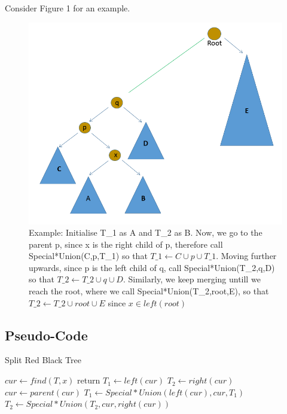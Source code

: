 \documentclass{article}
\begin{document}
Consider Figure 1 for an example.

\begin{figure}[h!]
\begin{center}
\includegraphics[scale=0.5]{tree.png}
\caption{ Example: Initialise T\_1 as A and T\_2 as B. Now, we go to the parent p, since x is the right child of p, therefore call Special*Union(C,p,T\_1) so that $T\_1 \gets C \cup p \cup T\_1$. Moving further upwards, since p is the left child of q, call Special*Union(T\_2,q,D) so that $T\_2 \gets T\_2 \cup q \cup D$. Similarly, we keep merging untill we reach the root, where we call Special*Union(T\_2,root,E), so that $T\_2 \gets T\_2 \cup root \cup E$ since $x \in left(root)$ }
\label{tree}
\end{center}
\end{figure}


\subsection{Pseudo-Code}
\begin{algorithm}
\caption{Split Red Black Tree}
\label{split}
\begin{algorithmic}[1]
\State $cur \gets find(T,x)$    
\State return
\EndIf
{} 
\State $T_1 \gets left(cur)$ 
\EndIf
{}
\State $T_2 \gets right(cur)$
\EndIf
{} 
\State $cur \gets parent(cur)$
\State $T_1 \gets Special*Union(left(cur),cur,T_1)$ 
\Else
\State $T_2 \gets Special*Union(T_2,cur,right(cur))$
\EndIf
\EndWhile
\EndProcedure
\end{algorithmic}
\end{algorithm}
\end{document}
